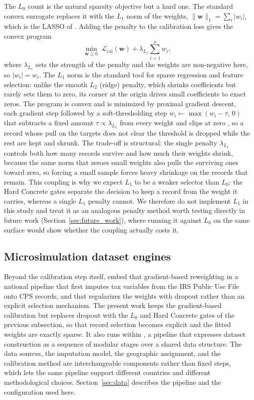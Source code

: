 The $L_0$ count is the natural sparsity objective but a hard one. The standard convex surrogate replaces
it with the $L_1$ norm of the weights, $\lVert \mathbf{w} \rVert_1 = \sum_i |w_i|$, which is the LASSO of
\citet{tibshirani1996}. Adding the penalty to the calibration loss gives the convex program
\begin{equation}
    \min_{\mathbf{w} \ge 0}\; \mathcal{L}_{\mathrm{cal}}(\mathbf{w}) + \lambda_{L_1} \sum_{i=1}^{n} w_i,
    \label{eq:l1}
\end{equation}
where $\lambda_{L_1}$ sets the strength of the penalty and the weights are non-negative here, so
$|w_i| = w_i$. The $L_1$ norm is the standard tool for sparse regression and feature selection: unlike the
smooth $L_2$ (ridge) penalty, which shrinks coefficients but rarely sets them to zero, its corner at the
origin drives small coefficients to exact zeros. The program is convex and is minimized by proximal
gradient descent, each gradient step followed by a soft-thresholding step
$w_i \leftarrow \max(w_i - \tau,\, 0)$ that subtracts a fixed amount $\tau \propto \lambda_{L_1}$ from every
weight and clips at zero \citep{beck2009fista}, so a record whose pull on the targets does not clear the
threshold is dropped while the rest are kept and shrunk. The trade-off is structural: the single penalty
$\lambda_{L_1}$ controls both how many records survive and how much their weights shrink, because the same
norm that zeroes small weights also pulls the surviving ones toward zero, so forcing a small sample forces
heavy shrinkage on the records that remain. This coupling is why we expect $L_1$ to be a weaker selector
than $L_0$: the Hard Concrete gates separate the decision to keep a record from the weight it carries,
whereas a single $L_1$ penalty cannot. We therefore do not implement $L_1$ in this study and treat it as
an analogous penalty method worth testing directly in future work (Section~\ref{sec:future_work}), where
running it against $L_0$ on the same surface would show whether the coupling actually costs it.

\subsection{Microsimulation dataset engines}

Beyond the calibration step itself, \citet{woodruff2024} embed that gradient-based reweighting in a
national pipeline that first imputes tax variables from the IRS Public Use File onto CPS records, and
that regularizes the weights with dropout rather than an explicit selection mechanism. The present
work keeps the gradient-based calibration but replaces dropout with the $L_0$ and Hard Concrete gates
of the previous subsection, so that record selection becomes explicit and the fitted weights are
exactly sparse. It also runs within \populace{}, a pipeline that
expresses dataset construction as a sequence of modular stages over a shared data structure. The data
sources, the imputation model, the geographic assignment, and the calibration method are
interchangeable components rather than fixed steps, which lets the same pipeline support different
countries and different methodological choices.
Section~\ref{sec:data} describes the pipeline and the configuration used here.
